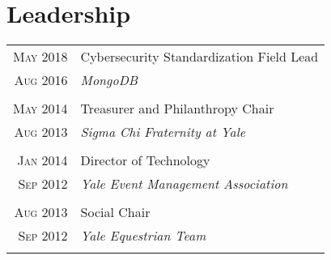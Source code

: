 \documentclass[a4paper,10pt]{article}
\begin{document}
\section{Leadership}
\begin{longtable}{r|p{11cm}}
 \nopagebreak \textsc{May 2018} & Cybersecurity Standardization Field Lead \\
 \nopagebreak \textsc{Aug 2016} & \small\emph{MongoDB} \\
 \multicolumn{2}{c}{} \\
 \nopagebreak \textsc{May 2014} & Treasurer and Philanthropy Chair \\
 \nopagebreak \textsc{Aug 2013} & \small\emph{Sigma Chi Fraternity at Yale} \\
 \multicolumn{2}{c}{} \\
 \nopagebreak \textsc{Jan 2014} & Director of Technology \\
 \nopagebreak \textsc{Sep 2012} & \small\emph{Yale Event Management Association} \\
 \multicolumn{2}{c}{} \\
 \nopagebreak \textsc{Aug 2013} & Social Chair \\
 \nopagebreak \textsc{Sep 2012} & \small\emph{Yale Equestrian Team} \\
 \multicolumn{2}{c}{} \\
\end{longtable}

\end{document}
